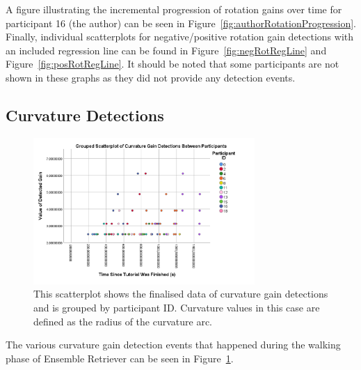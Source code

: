  A figure illustrating the incremental progression of rotation gains over time for participant 16 (the author) can be seen in Figure~\ref{fig:authorRotationProgression}. Finally, individual scatterplots for negative/positive rotation gain detections with an included regression line can be found in Figure~\ref{fig:negRotRegLine} and Figure~\ref{fig:posRotRegLine}. It should be noted that some participants are not shown in these graphs as they did not provide any detection events. 

\subsection{Curvature Detections}
\begin{figure}[tbph]
    \centering
    \includegraphics[width=0.75\textwidth]{figures/graphs/CurvatureDetectionScatter.png}
    \caption[Finalised Detection Scatterplot For Curvature Gains, Grouped by Participant ID]{This scatterplot shows the finalised data of curvature gain detections and is grouped by participant ID. Curvature values in this case are defined as the radius of the curvature arc.}
    \label{fig:curvatureDetectionData}
\end{figure}

The various curvature gain detection events that happened during the walking phase of Ensemble Retriever can be seen in Figure~\ref{fig:curvatureDetectionData}.


